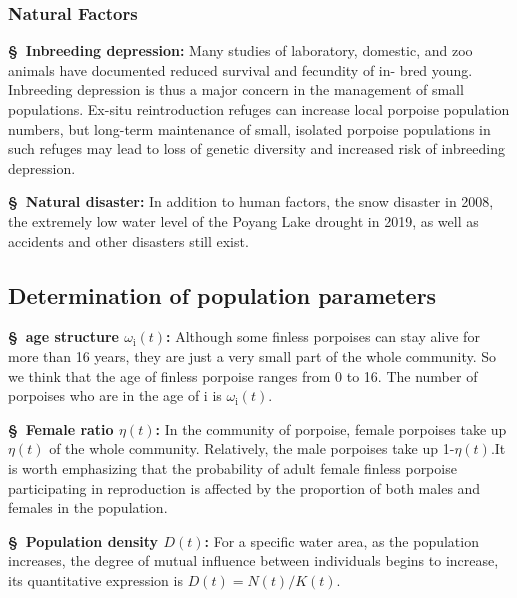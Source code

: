 \documentclass[12pt]{article}  %
\begin{document}
\subsubsection{Natural Factors }
\textbf{\S \ Inbreeding depression: }Many studies of laboratory, domestic, and zoo animals have documented reduced survival and fecundity of in- bred young. Inbreeding depression is thus a major concern in the management of small populations.
Ex-situ reintroduction refuges can increase local porpoise population numbers, but long-term maintenance of small, isolated porpoise populations in such refuges may lead to loss of genetic diversity and increased risk of inbreeding depression.

\textbf{\S \ Natural disaster: }In addition to human factors, the snow disaster in 2008, the extremely low water level of the Poyang Lake drought in 2019, as well as accidents and other disasters still exist.  

\subsection{Determination of population parameters}
\textbf{\S \ age structure ${{\omega }_{\text{i}}}(t)$: }Although some finless porpoises can stay alive for more than 16 years, they are just a very small part of the whole community. So we think that the age of finless porpoise ranges from 0 to 16. The number of porpoises who are in the age of i is  ${{\omega }_{\text{i}}}(t)$.

\textbf{\S \ Female ratio $\eta (t)$: }In the community of porpoise, female porpoises take up $\eta (t)$ of the whole community. Relatively, the male porpoises take up 1-$\eta (t)$.It is worth emphasizing that the probability of adult female finless porpoise participating in reproduction is affected by the proportion of both males and females in the population.

\textbf{\S \ Population density $D(t)$: }For a specific water area,  as the population increases, the degree of mutual influence between individuals begins to increase, its quantitative expression is $D(t)=N(t)/K(t)$.
\end{document}
